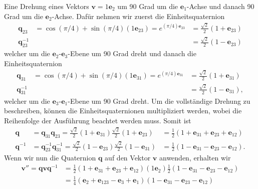 \begin{beispiel}
	Eine Drehung eines Vektors $\mathbf{v}= 1\mathbf{e}_2$ um 90 Grad um die $\mathbf{e}_1$-Achse und danach 90 Grad um die $\mathbf{e}_2$-Achse. Dafür nehmen wir zuerst die Einheitsquaternion 
	\begin{align}
	\mathbf{q}_{23} &= \cos(\pi/4) + \sin(\pi/4)(1\mathbf{e}_{23}) =  e^{(\pi/4)\mathbf{e}_{23}} &= \textstyle{\frac{\sqrt{2}}{2}}(1 + \mathbf{e}_{23})\\
	\mathbf{q}_{23}^{-1} &&= \textstyle{\frac{\sqrt{2}}{2}} (1- \mathbf{e}_{23})
	\end{align}
	welcher um die $\mathbf{e}_{2}$-$\mathbf{e}_{3}$-Ebene um 90 Grad dreht und danach die Einheitsquaternion 
	\begin{align}
	\mathbf{q}_{31} &= \cos(\pi/4) + \sin(\pi/4)(1\mathbf{e}_{31}) =  e^{(\pi/4)\mathbf{e}_{31}} &= \textstyle{\frac{\sqrt{2}}{2}}(1 + \mathbf{e}_{31})\\
	\mathbf{q}_{31}^{-1} &&= \textstyle{\frac{\sqrt{2}}{2}}(1 - \mathbf{e}_{31}),
	\end{align}
	welcher um die $\mathbf{e}_{3}$-$\mathbf{e}_{1}$-Ebene  um 90 Grad dreht. Um die vollständige Drehung zu beschreiben, können die Einheitsquaternionen multipliziert werden, wobei die Reihenfolge der Ausführung beachtet werden muss. Somit ist
	\begin{align} \label{FormelBeispielQuaternion}
	\mathbf{q} &= \mathbf{q}_{31}\mathbf{q}_{23} = \textstyle{\frac{\sqrt{2}}{2}}(1 + \mathbf{e}_{31})\textstyle{\frac{\sqrt{2}}{2}}(1 + \mathbf{e}_{23}) &= \textstyle{\frac{1}{2}}(1 + \mathbf{e}_{31} + \mathbf{e}_{23} + \mathbf{e}_{12})\\
	\mathbf{q}^{-1} &= \mathbf{q}_{23}^{-1}\mathbf{q}_{31}^{-1} = \textstyle{\frac{\sqrt{2}}{2}} (1- \mathbf{e}_{23})\textstyle{\frac{\sqrt{2}}{2}}(1 -\mathbf{e}_{31}) &= \textstyle{\frac{1}{2}}(1 - \mathbf{e}_{31} - \mathbf{e}_{23} - \mathbf{e}_{12}).
	\end{align}
	Wenn wir nun die Quaternion $\mathbf{q}$ auf den Vektor $\mathbf{v}$ anwenden, erhalten wir
	\begin{align}
	\mathbf{v}'' = \mathbf{qvq}^{-1} &= \textstyle{\frac{1}{2}}(1 + \mathbf{e}_{31} +  \mathbf{e}_{23} +  \mathbf{e}_{12})(1\mathbf{e}_2)\textstyle{\frac{1}{2}}(1 - \mathbf{e}_{31} -  \mathbf{e}_{23} -  \mathbf{e}_{12})\\ 
	&= \textstyle{\frac{1}{4}}(\mathbf{e}_2 +  \mathbf{e}_{123} -  \mathbf{e}_3 +  \mathbf{e}_1)(1 - \mathbf{e}_{31} -  \mathbf{e}_{23} -  \mathbf{e}_{12})\\

\end{align}
\end{beispiel}
